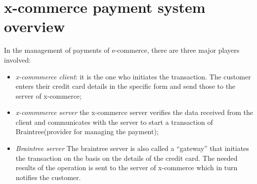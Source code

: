 \section{x-commerce payment system overview}
\label{sec:payment_system_overview}
In the management of payments of e-commerce, there are three major players involved:
\begin{itemize}
\item \emph{x-commmerce client}: it is the one who initiates the transaction. The customer enters their credit card details in the specific form and send those to the server of x-commerce;
\item \emph{x-commmerce server} the x-commerce server verifies the data received from the client and communicates with the server to start a transaction of Braintree(provider for managing the payment);
\item \emph{Braintree server} The braintree server is also called a “gateway” that initiates the transaction on the basis on the details of the credit card.
The needed results of the operation is sent to the server of x-commerce which in turn notifies the customer.
\end{itemize}
